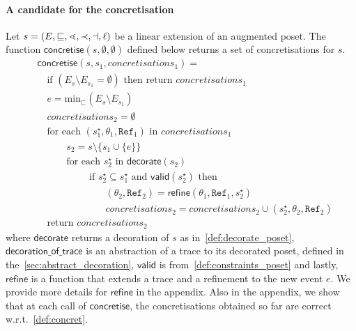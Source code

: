 \paragraph{A candidate for the concretisation}
Let $s = (E,\sqsubseteq,\lessdot,\prec,\dashv,\ell)$ be a linear extension of an augmented poset. The function $\mathsf{concretise}(s,\emptyset,\emptyset)$ defined below returns a set of concretisations for $s$.
\begin{align*}
  &\mathsf{concretise}(s,s_1,\mathit{concretisations}_1) = \\
  &\quad\text{if }(E_s\setminus E_{s_1} = \emptyset)\text{ then return }\mathit{concretisations}_1\\
  &\quad e = \text{min}_{\sqsubset}(E_s\setminus E_{s_1})\\
  &\quad\mathit{concretisations}_2 = \emptyset \\
  &\quad\text{for each }(s_1^{\star},\theta_1,\mathtt{Ref}_1)\text{ in }\mathit{concretisations}_1\\
  &\quad\qquad s_2 = s\setminus\{s_1\cup\{e\}\}\\
  &\quad\qquad\text{for each }s_2^{\star}\text{ in }\mathsf{decorate}(s_2)\\
  &\quad\qquad\qquad \text{ if }s_2^{\star}\subseteq s_1^{\star}\text{ and }\mathsf{valid}(s_2^{\star})\text{ then }\\
  &\quad\qquad\qquad\qquad (\mathit{\theta_2},\mathtt{Ref}_2) = \mathsf{refine}(\theta_1,\mathtt{Ref}_1,s_2^{\star})\\
  &\quad\qquad\qquad\qquad \mathit{concretisations}_2 = \mathit{concretisations}_2 \cup (s_2^{\star},\mathit{\theta_2},\mathtt{Ref}_2)\\
  &\quad\text{return }\mathit{concretisations}_2
\end{align*}
where $\mathsf{decorate}$ returns a decoration of $s$ as in~\autoref{def:decorate_poset}, $\mathsf{decoration\_of\_trace}$ is an abstraction of a trace to its decorated poset, defined in the~\autoref{sec:abstract_decoration}, $\mathsf{valid}$ is from~\autoref{def:constraints_poset} and lastly, $\mathsf{refine}$ is a function that extends a trace and a refinement to the new event $e$. We provide more details for $\mathsf{refine}$ in the appendix. Also in the appendix, we show that at each call of $\mathsf{concretise}$, the concretisations obtained so far are correct w.r.t.~\autoref{def:concret}.

